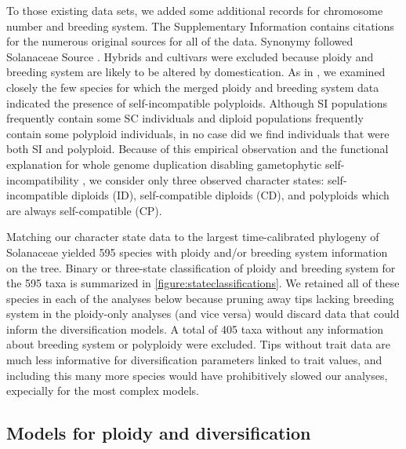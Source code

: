 To those existing data sets, we added some additional records for chromosome number and breeding system.
The Supplementary Information contains citations for the numerous original sources for all of the data. %
Synonymy followed Solanaceae Source \citep{solsource}.
Hybrids and cultivars were excluded because ploidy and breeding system are likely to be altered by domestication.
As in \citet{robertson_2011}, we examined closely the few species for which the merged ploidy and breeding system data indicated the presence of self-incompatible polyploids.
Although SI populations frequently contain some SC individuals and diploid populations frequently contain some polyploid individuals, in no case did we find individuals that were both SI and polyploid.
Because of this empirical observation and the functional explanation for whole genome duplication disabling gametophytic self-incompatibility \citep[reviewed in][]{ramsey_1998,stone_2002}, we consider only three observed character states: self-incompatible diploids (ID), self-compatible diploids (CD), and polyploids which are always self-compatible (CP).


Matching our character state data to the largest time-calibrated phylogeny of Solanaceae \citep{sarkinen_2013} yielded 595 species with ploidy and/or breeding system information on the tree.
Binary or three-state classification of ploidy and breeding system for the 595 taxa is summarized in \cref{figure:stateclassifications}.
We retained all of these species in each of the analyses below because pruning away tips lacking breeding system in the ploidy-only analyses (and vice versa) would discard data that could inform the diversification models.
A total of 405 taxa without any information about breeding system or polyploidy were excluded.
Tips without trait data are much less informative for diversification parameters linked to trait values, and including this many more species would have prohibitively slowed our analyses, expecially for the most complex models.


\subsection{Models for ploidy and diversification}

